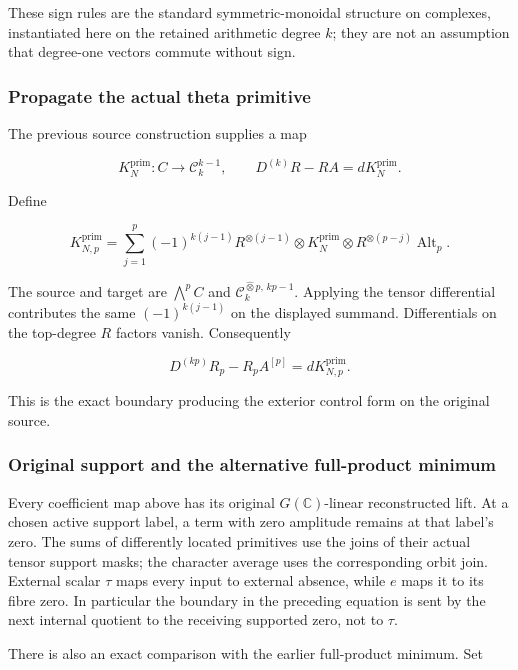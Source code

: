 These sign rules are the standard symmetric-monoidal structure on
complexes, instantiated here on the retained arithmetic degree \(k\);
they are not an assumption that degree-one vectors commute without sign.

\subsubsection{Propagate the actual theta
primitive}\label{exttrace-propagate-the-actual-theta-primitive}

The previous source construction supplies a map

\[
K_N^{\mathrm{prim}}:C\to\mathcal C_k^{k-1},
\qquad D^{(k)}R-RA=dK_N^{\mathrm{prim}}.
\]

Define

\[
\boxed{
K_{N,p}^{\mathrm{prim}}
=\sum_{j=1}^p(-1)^{k(j-1)}
R^{\otimes(j-1)}\otimes K_N^{\mathrm{prim}}\otimes R^{\otimes(p-j)}
\operatorname{Alt}_p.
}
\]

The source and target are \(\bigwedge^pC\) and
\(\mathcal C_k^{\widehat\otimes p,\,kp-1}\). Applying the tensor
differential contributes the same \((-1)^{k(j-1)}\) on the displayed
summand. Differentials on the top-degree \(R\) factors vanish.
Consequently

\[
\boxed{
D^{(kp)}R_p-R_pA^{[p]}=dK_{N,p}^{\mathrm{prim}}.
}
\]

This is the exact boundary producing the exterior control form on the
original source.

\subsubsection{Original support and the alternative full-product
minimum}\label{exttrace-original-support-and-the-alternative-full-product-minimum}

Every coefficient map above has its original \(G(\mathbb C)\)-linear
reconstructed lift. At a chosen active support label, a term with zero
amplitude remains at that label's zero. The sums of differently located
primitives use the joins of their actual tensor support masks; the
character average uses the corresponding orbit join. External scalar
\(\tau\) maps every input to external absence, while \(e\) maps it to
its fibre zero. In particular the boundary in the preceding equation is
sent by the next internal quotient to the receiving supported zero, not
to \(\tau\).

There is also an exact comparison with the earlier full-product minimum.
Set

